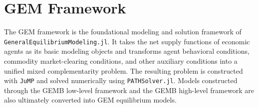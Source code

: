 \documentclass[
  letterpaper,
  DIV=11,
  numbers=noendperiod]{scrreprt}
\newenvironment{Shaded}{\begin{snugshade}}{\end{snugshade}}
\newcommand{\ConstantTok}[1]{\textcolor[rgb]{0.56,0.35,0.01}{#1}}
\newcommand{\FloatTok}[1]{\textcolor[rgb]{0.68,0.00,0.00}{#1}}
\newcommand{\FunctionTok}[1]{\textcolor[rgb]{0.28,0.35,0.67}{#1}}
\newcommand{\NormalTok}[1]{\textcolor[rgb]{0.00,0.23,0.31}{#1}}
\newcommand{\OperatorTok}[1]{\textcolor[rgb]{0.37,0.37,0.37}{#1}}
\newcommand{\StringTok}[1]{\textcolor[rgb]{0.13,0.47,0.30}{#1}}
\begin{document}
%

\section{GEM Framework}\label{gem-framework}

The GEM framework is the foundational modeling and solution framework of
\texttt{GeneralEquilibriumModeling.jl}. It takes the net supply
functions of economic agents as its basic modeling objects and
transforms agent behavioral conditions, commodity market-clearing
conditions, and other auxiliary conditions into a unified mixed
complementarity problem. The resulting problem is constructed with
\texttt{JuMP} and solved numerically using \texttt{PATHSolver.jl}.
Models constructed through the GEMB low-level framework and the GEMB
high-level framework are also ultimately converted into GEM equilibrium
models.
\end{document}
